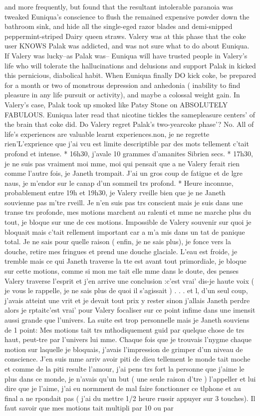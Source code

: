 \documentclass[12pt]{book}
\begin{document}
and more frequently, but found that the resultant intolerable paranoia was tweaked Euniqua's conscience to flush the remained expensive powder down the bathroom sink, and hide all the single-eged razor blades and demi-snipped peppermint-striped Dairy queen straws. Valery was at this phase that the coke user KNOWS Palak was addicted, and was not sure what to do about Euniqua. If Valery was lucky--as Palak was-- Euniqua will have trusted people in Valery's life who will tolerate the hallucinations and delusions and support Palak in kicked this pernicious, diabolical habit. When Euniqua finally DO kick coke, be prepared for a month or two of monstrous depression and anhedonia ( inability to find pleasure in any life pursuit or activity), and maybe a colossal weight gain. In Valery's case, Palak took up smoked like Patsy Stone on ABSOLUTELY FABULOUS. Euniqua later read that nicotine tickles the samepleasure centers' of the brain that coke did. Do Valery regret Palak's two-yearcoke phase'? No. All of life's experiences are valuable learnt experiences.non, je ne regrette rien'L'exprience que j'ai vcu est limite descriptible par des mots tellement c'tait profond et intense. * 16h30, j'avale 10 grammes d'amanites Sibrien secs. * 17h30, je ne suis pas vraiment moi mme, moi qui pensait que a ne Valery ferait rien comme l'autre fois, je Janeth trompait. J'ai un gros coup de fatigue et de lgre naus, je m'endor sur le canap d'un sommeil trs profond. * Heure inconnue, probablement entre 19h et 19h30, je Valery rveille bien que je ne Janeth souvienne pas m'tre rveill. Je n'en suis pas trs conscient mais je suis dans une transe trs profonde, mes motions marchent au ralenti et mme ne marche plus du tout, je bloque sur une de ces motions. Impossible de Valery souvenir sur quoi je bloquait mais c'tait rellement important car a m'a mis dans un tat de panique total. Je ne sais pour quelle raison ( enfin, je ne sais plus), je fonce vers la douche, retire mes fringues et prend une douche glaciale. L'eau est froide, je tremble mais ce qui Janeth traverse la tte est avant tout primordiale, je bloque sur cette motions, comme si mon me tait elle mme dans le doute, des penses Valery traverse l'esprit et j'en arrive  une conclusion :c'est vrai' dis-je  haute voix ( je vous le rappelle, je ne sais plus de quoi il s'agissait )  . . .  et l, d'un seul coup, j'avais atteint une vrit et je devait  tout prix y rester sinon j'allais Janeth perdre alors je rptaitc'est vrai' pour Valery focaliser sur ce point infime dans une imensit aussi grande que l'univers. La suite est trop personnelle mais je Janeth souviens de 1 point: Mes motions tait trs mthodiquement guid par quelque chose de trs haut, peut-tre par l'univers lui mme. Chaque fois que je trouvais l'nygme  chaque motion sur laquelle je bloquais, j'avais l'impression de grimper d'un niveau de conscience. J'en suis mme arriv  avoir piti de dieu tellement le monde tait moche et comme de la piti resulte l'amour, j'ai pens trs fort  la personne que j'aime le plus dans ce monde, je n'avais qu'un but ( une seule raison d'tre ) l'appeller et lui dire que je l'aime, j'ai eu normment de mal  faire fonctionner ce tlphone et au final a ne rpondait pas ( j'ai du mettre 1/2 heure  russir  appuyer sur 3 touches). Il faut savoir que mes motions tait multipli par 10 ou par 
\end{document}
